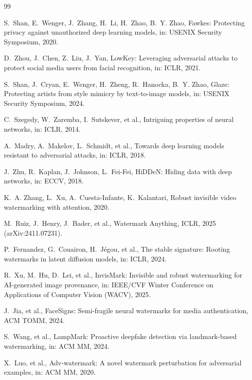 \documentclass[preprint,12pt]{elsarticle}
\begin{document}

\begin{thebibliography}{99}

 S.~Shan, E.~Wenger, J.~Zhang, H.~Li, H.~Zhao, B.~Y. Zhao, Fawkes: Protecting privacy against unauthorized deep learning models, in: USENIX Security Symposium, 2020.

 D.~Zhou, J.~Chen, Z.~Liu, J.~Yan, LowKey: Leveraging adversarial attacks to protect social media users from facial recognition, in: ICLR, 2021.

 S.~Shan, J.~Cryan, E.~Wenger, H.~Zheng, R.~Hanocka, B.~Y. Zhao, Glaze: Protecting artists from style mimicry by text-to-image models, in: USENIX Security Symposium, 2024.

 C.~Szegedy, W.~Zaremba, I.~Sutskever, et al., Intriguing properties of neural networks, in: ICLR, 2014.

 A.~Madry, A.~Makelov, L.~Schmidt, et al., Towards deep learning models resistant to adversarial attacks, in: ICLR, 2018.

 J.~Zhu, R.~Kaplan, J.~Johnson, L.~Fei-Fei, HiDDeN: Hiding data with deep networks, in: ECCV, 2018.

 K.~A. Zhang, L.~Xu, A.~Cuesta-Infante, K.~Kalantari, Robust invisible video watermarking with attention, 2020.

 M.~Ruiz, J.~Henry, J.~Bader, et al., Watermark Anything, ICLR, 2025 (arXiv:2411.07231).

 P.~Fernandez, G.~Couairon, H.~J{\'e}gou, et al., The stable signature: Rooting watermarks in latent diffusion models, in: ICLR, 2024.

 R.~Xu, M.~Hu, D.~Lei, et al., InvisMark: Invisible and robust watermarking for AI-generated image provenance, in: IEEE/CVF Winter Conference on Applications of Computer Vision (WACV), 2025.

 J.~Jia, et al., FaceSigns: Semi-fragile neural watermarks for media authentication, ACM TOMM, 2024.

 S.~Wang, et al., LampMark: Proactive deepfake detection via landmark-based watermarking, in: ACM MM, 2024.

 X.~Luo, et al., Adv-watermark: A novel watermark perturbation for adversarial examples, in: ACM MM, 2020.


\end{thebibliography}
\end{document}
